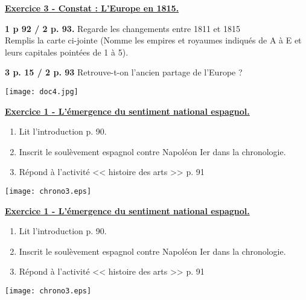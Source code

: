 \documentclass[12pt]{article}
\begin{document}
\vfill

\underline{\textbf{Exercice 3 - Constat : L'Europe en 1815.}}\\

 \begin{minipage}{8cm}
\textbf{1 p 92 / 2 p. 93.} Regarde les changements entre 1811 et 1815 \\
 Remplis la carte ci-jointe (Nomme les empires et royaumes indiqués de A à E et leurs capitales pointées de 1 à 5).
 
 \vspace{0.5cm}
 
 \textbf{3 p. 15 / 2 p. 93} Retrouve-t-on l'ancien partage de l'Europe ?
 \vspace{2cm}
 \end{minipage}
 \begin{minipage}{8cm}
\texttt{[image: doc4.jpg]}
 \end{minipage}

\newpage

\underline{\textbf{Exercice 1 - L'émergence du sentiment national espagnol.}}\\

\begin{minipage}{5cm}
\begin{enumerate}
 \item Lit l'introduction p. 90.
 \item Inscrit le soulèvement espagnol contre Napoléon Ier dans la chronologie.
 \item Répond à l'activité << histoire des arts >> p. 91
 \end{enumerate}
\end{minipage}
\begin{minipage}{10cm}
\texttt{[image: chrono3.eps]}
\end{minipage}

\vfill

\underline{\textbf{Exercice 1 - L'émergence du sentiment national espagnol.}}\\

\begin{minipage}{5cm}
\begin{enumerate}
 \item Lit l'introduction p. 90.
 \item Inscrit le soulèvement espagnol contre Napoléon Ier dans la chronologie.
 \item Répond à l'activité << histoire des arts >> p. 91
 \end{enumerate}
\end{minipage}
\begin{minipage}{10cm}
\texttt{[image: chrono3.eps]}
\end{minipage}
\end{document}

